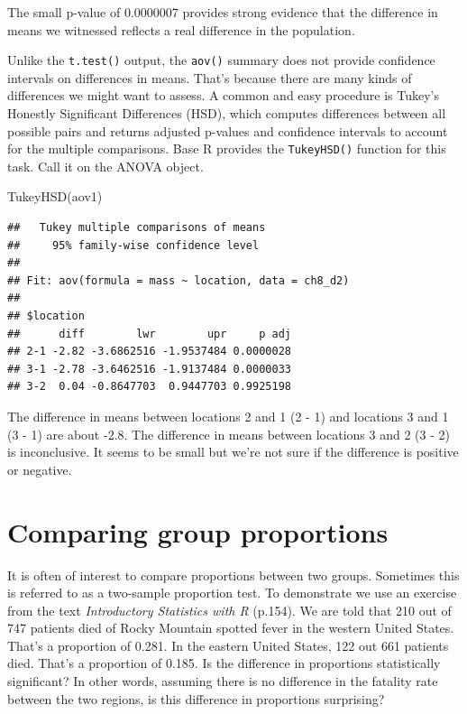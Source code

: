 \documentclass[
]{book}
\newenvironment{Shaded}{\begin{snugshade}}{\end{snugshade}}
\newcommand{\FunctionTok}[1]{\textcolor[rgb]{0.00,0.00,0.00}{#1}}
\newcommand{\NormalTok}[1]{#1}
\begin{document}
The small p-value of 0.0000007 provides strong evidence that the difference in means we witnessed reflects a real difference in the population.

Unlike the \texttt{t.test()} output, the \texttt{aov()} summary does not provide confidence intervals on differences in means. That's because there are many kinds of differences we might want to assess. A common and easy procedure is Tukey's Honestly Significant Differences (HSD), which computes differences between all possible pairs and returns adjusted p-values and confidence intervals to account for the multiple comparisons. Base R provides the \texttt{TukeyHSD()} function for this task. Call it on the ANOVA object.

\begin{Shaded}
\begin{Highlighting}[]
\FunctionTok{TukeyHSD}\NormalTok{(aov1)}
\end{Highlighting}
\end{Shaded}

\begin{verbatim}
##   Tukey multiple comparisons of means
##     95% family-wise confidence level
## 
## Fit: aov(formula = mass ~ location, data = ch8_d2)
## 
## $location
##      diff        lwr        upr     p adj
## 2-1 -2.82 -3.6862516 -1.9537484 0.0000028
## 3-1 -2.78 -3.6462516 -1.9137484 0.0000033
## 3-2  0.04 -0.8647703  0.9447703 0.9925198
\end{verbatim}

The difference in means between locations 2 and 1 (2 - 1) and locations 3 and 1 (3 - 1) are about -2.8. The difference in means between locations 3 and 2 (3 - 2) is inconclusive. It seems to be small but we're not sure if the difference is positive or negative.

\hypertarget{comparing-group-proportions}{%
\section{Comparing group proportions}\label{comparing-group-proportions}}

It is often of interest to compare proportions between two groups. Sometimes this is referred to as a two-sample proportion test. To demonstrate we use an exercise from the text \emph{Introductory Statistics with R} \citep{Dalgaard_2020} (p.154). We are told that 210 out of 747 patients died of Rocky Mountain spotted fever in the western United States. That's a proportion of 0.281. In the eastern United States, 122 out 661 patients died. That's a proportion of 0.185. Is the difference in proportions statistically significant? In other words, assuming there is no difference in the fatality rate between the two regions, is this difference in proportions surprising?
\end{document}
